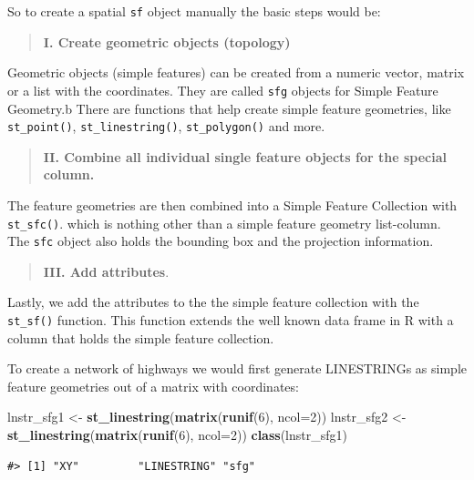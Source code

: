 \documentclass[
]{book}
\newenvironment{Shaded}{\begin{snugshade}}{\end{snugshade}}
\newcommand{\AttributeTok}[1]{\textcolor[rgb]{0.13,0.29,0.53}{#1}}
\newcommand{\DecValTok}[1]{\textcolor[rgb]{0.00,0.00,0.81}{#1}}
\newcommand{\FunctionTok}[1]{\textcolor[rgb]{0.13,0.29,0.53}{\textbf{#1}}}
\newcommand{\NormalTok}[1]{#1}
\newcommand{\OtherTok}[1]{\textcolor[rgb]{0.56,0.35,0.01}{#1}}
\begin{document}
So to create a spatial \texttt{sf} object manually the basic steps would be:

\begin{quote}
\textbf{I. Create geometric objects (topology)}
\end{quote}

Geometric objects (simple features) can be created from a numeric vector, matrix or a list with the coordinates. They are called \texttt{sfg} objects for Simple Feature Geometry.b There are functions that help create simple feature geometries, like \texttt{st\_point()}, \texttt{st\_linestring()}, \texttt{st\_polygon()} and more.

\begin{quote}
\textbf{II. Combine all individual single feature objects for the special column.}
\end{quote}

The feature geometries are then combined into a Simple Feature Collection with \texttt{st\_sfc()}. which is nothing other than a simple feature geometry list-column. The \texttt{sfc} object also holds the bounding box and the projection information.

\begin{quote}
\textbf{III. Add attributes}.
\end{quote}

Lastly, we add the attributes to the the simple feature collection with the \texttt{st\_sf()} function. This function extends the well known data frame in R with a column that holds the simple feature collection.

To create a network of highways we would first generate LINESTRINGs as simple feature geometries out of a matrix with coordinates:

\begin{Shaded}
\begin{Highlighting}[]
\NormalTok{lnstr\_sfg1 }\OtherTok{\textless{}{-}} \FunctionTok{st\_linestring}\NormalTok{(}\FunctionTok{matrix}\NormalTok{(}\FunctionTok{runif}\NormalTok{(}\DecValTok{6}\NormalTok{), }\AttributeTok{ncol=}\DecValTok{2}\NormalTok{)) }
\NormalTok{lnstr\_sfg2 }\OtherTok{\textless{}{-}} \FunctionTok{st\_linestring}\NormalTok{(}\FunctionTok{matrix}\NormalTok{(}\FunctionTok{runif}\NormalTok{(}\DecValTok{6}\NormalTok{), }\AttributeTok{ncol=}\DecValTok{2}\NormalTok{)) }
\FunctionTok{class}\NormalTok{(lnstr\_sfg1)}
\end{Highlighting}
\end{Shaded}

\begin{verbatim}
#> [1] "XY"         "LINESTRING" "sfg"
\end{verbatim}
\end{document}
